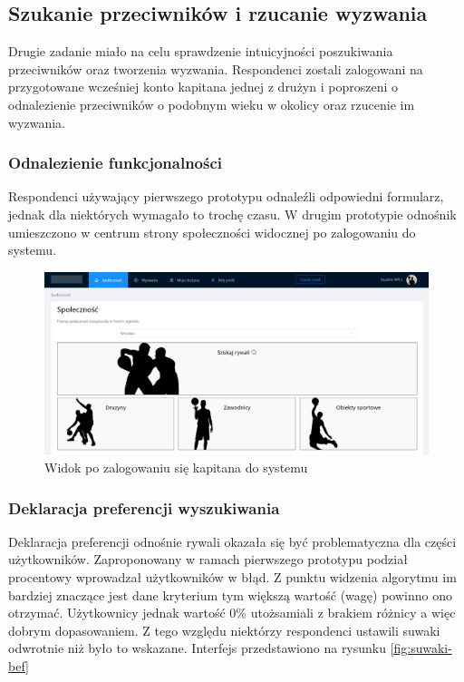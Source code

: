 \subsection{Szukanie przeciwników i rzucanie wyzwania}

Drugie zadanie miało na celu sprawdzenie intuicyjności poszukiwania przeciwników oraz tworzenia wyzwania. Respondenci zostali zalogowani na przygotowane wcześniej konto kapitana jednej z drużyn i poproszeni o odnalezienie przeciwników o podobnym wieku w okolicy oraz rzucenie im wyzwania.

\subsubsection{Odnalezienie funkcjonalności}

Respondenci używający pierwszego prototypu odnaleźli odpowiedni formularz, jednak dla niektórych wymagało to trochę czasu. W drugim prototypie odnośnik umieszczono w centrum strony społeczności widocznej po zalogowaniu do systemu.

\begin{figure}[H]
\centering
\includegraphics[width=\linewidth]{07-walidacja/rys/spolecznosc.PNG}
\caption{Widok po zalogowaniu się kapitana do systemu}
\label{fig:view-player-skill}
\end{figure}

\subsubsection{Deklaracja preferencji wyszukiwania}

Deklaracja preferencji odnośnie rywali okazała się być problematyczna dla części użytkowników. Zaproponowany w ramach pierwszego prototypu podział procentowy wprowadzał użytkowników w błąd. Z punktu widzenia algorytmu im bardziej znaczące jest dane kryterium tym większą wartość (wagę) powinno ono otrzymać. Użytkownicy jednak wartość 0\% utożsamiali z brakiem różnicy a więc dobrym dopasowaniem. Z tego względu niektórzy respondenci ustawili suwaki odwrotnie niż było to wskazane. Interfejs przedstawiono na rysunku \ref{fig:suwaki-bef}

